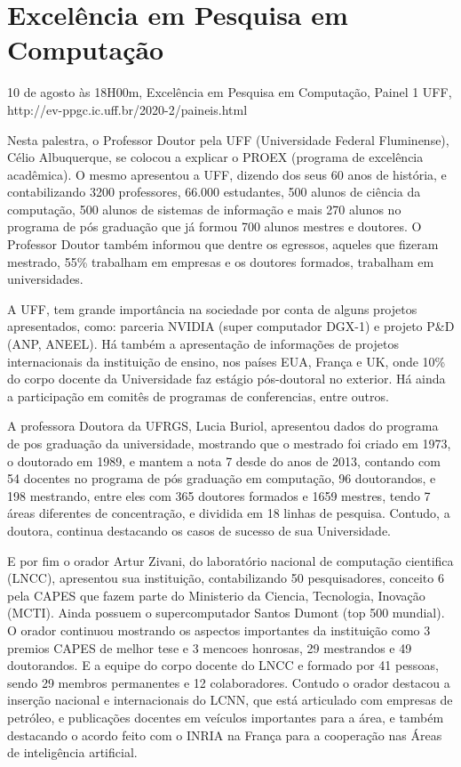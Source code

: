 \section{Excelência em Pesquisa em Computação}

\begin{center}
  \vspace{1cm}
  10 de agosto às 18H00m, Excelência em Pesquisa em Computação, Painel 1 UFF, http://ev-ppgc.ic.uff.br/2020-2/paineis.html
  \vspace{1cm}
\end{center}


Nesta palestra, o Professor Doutor pela UFF (Universidade Federal Fluminense), Célio Albuquerque, se colocou a explicar o PROEX (programa de excelência acadêmica). O mesmo apresentou a UFF, dizendo dos seus 60 anos de história, e contabilizando 3200 professores, 66.000 estudantes, 500 alunos de ciência da computação, 500 alunos de sistemas de informação e mais 270 alunos no programa de pós graduação que já formou 700 alunos mestres e doutores. O Professor Doutor também informou que dentre os egressos, aqueles que fizeram mestrado, 55\% trabalham em empresas e os doutores formados, trabalham em universidades. 

A UFF, tem grande importância na sociedade por conta de alguns projetos apresentados, como: parceria NVIDIA (super computador DGX-1) e projeto P\&D (ANP, ANEEL). Há também a apresentação de informações de projetos internacionais da instituição de ensino, nos países EUA, França e UK, onde 10\% do corpo docente da Universidade faz estágio pós-doutoral no exterior. Há ainda a participação em comitês de programas de conferencias, entre outros.

A professora Doutora da UFRGS, Lucia Buriol, apresentou dados do programa de pos graduação da universidade, mostrando que o mestrado foi criado em 1973, o doutorado em 1989, e mantem a nota 7 desde do anos de 2013, contando com 54 docentes no programa de pós graduação em computação, 96 doutorandos, e 198 mestrando, entre eles com 365 doutores formados e 1659 mestres, tendo 7 áreas diferentes de concentração, e dividida em 18 linhas de pesquisa. Contudo, a doutora, continua destacando os casos de sucesso de sua Universidade.

E por fim o orador Artur Zivani, do laboratório nacional de computação cientifica (LNCC), apresentou sua instituição, contabilizando 50 pesquisadores, conceito 6 pela CAPES que fazem parte do Ministerio da Ciencia, Tecnologia, Inovação  (MCTI). Ainda possuem o supercomputador Santos Dumont (top 500 mundial). O orador continuou mostrando os aspectos importantes da instituição como 3 premios CAPES de melhor tese e 3 mencoes honrosas, 29 mestrandos e 49 doutorandos. E a equipe do corpo docente do LNCC  e formado por 41 pessoas, sendo 29 membros permanentes e 12 colaboradores. Contudo o orador destacou a inserção nacional e internacionais do LCNN, que está articulado com empresas de petróleo, e publicações docentes em veículos importantes para a área, e também destacando o acordo feito com o INRIA na França para a cooperação nas Áreas de inteligência artificial.